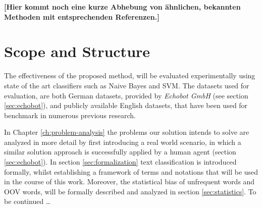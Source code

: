 \textbf{[Hier kommt noch eine kurze Abhebung von ähnlichen, bekannten Methoden mit
entsprechenden Referenzen.]}


\section{Scope and Structure}
The effectiveness of the proposed method, will be evaluated experimentally using 
state of the art classifiers such as Naive Bayes and SVM. The datasets used for
evaluation, are both German datasets, provided by \emph{Echobot GmbH} 
(see section \ref{sec:echobot}), and publicly available English datasets, 
that have been used for benchmark in numerous previous research. 


In Chapter \ref{ch:problem-analysis} the problems our solution intends
to solve are analyzed in more detail by first introducing a real world
scenario, in which a similar solution approach is successfully applied by a
human agent (section \ref{sec:echobot}). In section \ref{sec:formalization} text
classification is introduced formally, whilst establishing a framework of
terms and notations that will be used in the course of this work. Moreover, the
statistical bias of unfrequent words and OOV words, will be formally described 
and analyzed in section \ref{sec:statistics}. To be continued \ldots
 